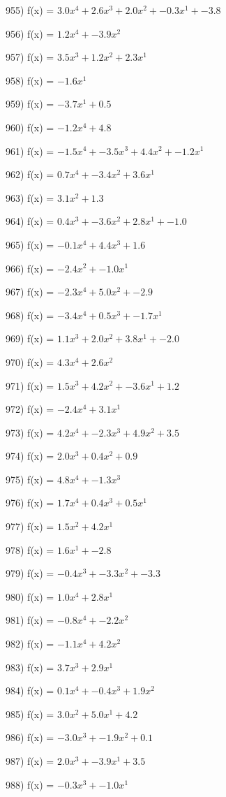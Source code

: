 \documentclass[10pt,a4paper]{article}
\begin{document}
955) f(x) = $3.0x^4 + 2.6x^3 + 2.0x^2 + -0.3x^1 + -3.8$

956) f(x) = $1.2x^4 + -3.9x^2$

957) f(x) = $3.5x^3 + 1.2x^2 + 2.3x^1$

958) f(x) = $-1.6x^1$

959) f(x) = $-3.7x^1 + 0.5$

960) f(x) = $-1.2x^4 + 4.8$

961) f(x) = $-1.5x^4 + -3.5x^3 + 4.4x^2 + -1.2x^1$

962) f(x) = $0.7x^4 + -3.4x^2 + 3.6x^1$

963) f(x) = $3.1x^2 + 1.3$

964) f(x) = $0.4x^3 + -3.6x^2 + 2.8x^1 + -1.0$

965) f(x) = $-0.1x^4 + 4.4x^3 + 1.6$

966) f(x) = $-2.4x^2 + -1.0x^1$

967) f(x) = $-2.3x^4 + 5.0x^2 + -2.9$

968) f(x) = $-3.4x^4 + 0.5x^3 + -1.7x^1$

969) f(x) = $1.1x^3 + 2.0x^2 + 3.8x^1 + -2.0$

970) f(x) = $4.3x^4 + 2.6x^2$

971) f(x) = $1.5x^3 + 4.2x^2 + -3.6x^1 + 1.2$

972) f(x) = $-2.4x^4 + 3.1x^1$

973) f(x) = $4.2x^4 + -2.3x^3 + 4.9x^2 + 3.5$

974) f(x) = $2.0x^3 + 0.4x^2 + 0.9$

975) f(x) = $4.8x^4 + -1.3x^3$

976) f(x) = $1.7x^4 + 0.4x^3 + 0.5x^1$

977) f(x) = $1.5x^2 + 4.2x^1$

978) f(x) = $1.6x^1 + -2.8$

979) f(x) = $-0.4x^3 + -3.3x^2 + -3.3$

980) f(x) = $1.0x^4 + 2.8x^1$

981) f(x) = $-0.8x^4 + -2.2x^2$

982) f(x) = $-1.1x^4 + 4.2x^2$

983) f(x) = $3.7x^3 + 2.9x^1$

984) f(x) = $0.1x^4 + -0.4x^3 + 1.9x^2$

985) f(x) = $3.0x^2 + 5.0x^1 + 4.2$

986) f(x) = $-3.0x^3 + -1.9x^2 + 0.1$

987) f(x) = $2.0x^3 + -3.9x^1 + 3.5$

988) f(x) = $-0.3x^3 + -1.0x^1$
\end{document}
